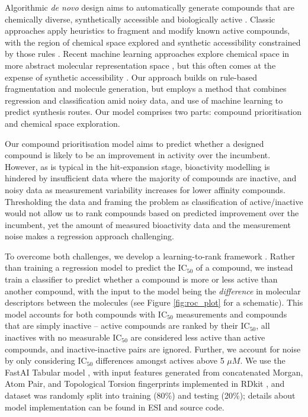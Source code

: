 Algorithmic \emph{de novo} design aims to automatically generate compounds that are chemically diverse, synthetically accessible and biologically active \cite{schneider2016novo}. Classic approaches apply heuristics to fragment and modify known active compounds, with the region of chemical space explored and synthetic accessibility constrained by those rules \cite{brown2004graph,patel2009knowledge,hartenfeller2012dogs}. Recent machine learning approaches explore chemical space in more abstract molecular representation space \cite{gomez2018automatic,segler2018generating}, but this often comes at the expense of synthetic accessibility \cite{Gao2020Synthesizability}. Our approach builds on rule-based fragmentation and molecule generation, but employs a method that combines regression and classification amid noisy data, and use of machine learning to predict synthesis routes. Our model comprises two parts: compound prioritisation and chemical space exploration. 

Our compound prioritisation model aims to predict whether a designed compound is likely to be an improvement in activity over the incumbent. However, as is typical in the hit-expansion stage, bioactivity modelling is hindered by insufficient data where the majority of compounds are inactive, and noisy data as measurement variability increases for lower affinity compounds. Thresholding the data and framing the problem as classification of active/inactive would not allow us to rank compounds based on predicted improvement over the incumbent, yet the amount of measured bioactivity data and the measurement noise makes a regression approach challenging.




To overcome both challenges, we develop a learning-to-rank framework \cite{duffy2010molecular,agarwal2010ranking}. Rather than training a regression model to predict the $\mathrm{IC}_{50}$ of a compound, we instead train a classifier to predict whether a compound is more or less active than another compound, with the input to the model being the \emph{difference} in molecular descriptors between the molecules (see Figure \ref{fig:roc_plot} for a schematic). This model accounts for both compounds with $\mathrm{IC}_{50}$ measurements and compounds that are simply inactive -- active compounds are ranked by their $\mathrm{IC}_{50}$, all inactives with no measurable $\mathrm{IC}_{50}$ are considered less active than active compounds, and inactive-inactive pairs are ignored. Further, we account for noise by only considering $\mathrm{IC}_{50}$ differences amongst actives above 5 $\mu M$. We use the FastAI Tabular model \cite{howard2018fastai}, with input features generated from concatenated Morgan, Atom Pair, and Topological Torsion fingerprints implemented in RDkit \cite{rdkit}, and dataset was randomly split into training (80\%) and testing (20\%); details about model implementation can be found in ESI and source code.


